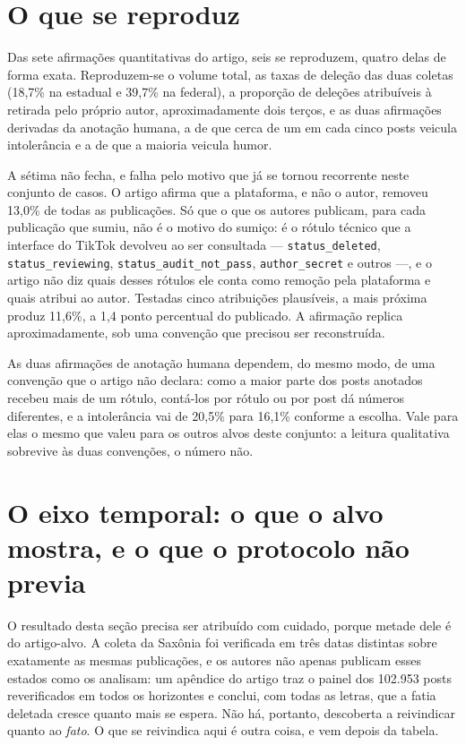\section{O que se reproduz}
\label{sec:tiktok-reproduz}

Das sete afirmações quantitativas do artigo, seis se reproduzem, quatro delas de
forma exata. Reproduzem-se o volume total, as taxas de deleção das duas coletas
(18,7\% na estadual e 39,7\% na federal), a proporção de deleções atribuíveis à
retirada pelo próprio autor, aproximadamente dois terços, e as duas afirmações
derivadas da anotação humana, a de que cerca de um em cada cinco posts veicula
intolerância e a de que a maioria veicula humor.

A sétima não fecha, e falha pelo motivo que já se tornou recorrente neste conjunto de
casos. O artigo afirma que a plataforma, e não o autor, removeu 13,0\% de todas as
publicações. Só que o que os autores publicam, para cada publicação que sumiu, não é o
motivo do sumiço: é o rótulo técnico que a interface do TikTok devolveu ao ser
consultada --- \texttt{status\_deleted}, \texttt{status\_reviewing},
\texttt{status\_audit\_not\_pass}, \texttt{author\_secret} e outros ---, e o artigo não
diz quais desses rótulos ele conta como remoção pela plataforma e quais atribui ao
autor. Testadas cinco atribuições plausíveis, a mais próxima produz 11,6\%, a 1,4 ponto
percentual do publicado. A afirmação replica aproximadamente, sob uma convenção que
precisou ser reconstruída.

As duas afirmações de anotação humana dependem, do mesmo modo, de uma convenção que o
artigo não declara: como a maior parte dos posts anotados recebeu mais de um rótulo,
contá-los por rótulo ou por post dá números diferentes, e a intolerância vai de 20,5\%
para 16,1\% conforme a escolha. Vale para elas o mesmo que valeu para os outros alvos
deste conjunto: a leitura qualitativa sobrevive às duas convenções, o número não.

\section{O eixo temporal: o que o alvo mostra, e o que o protocolo não previa}
\label{sec:tiktok-eixo}

O resultado desta seção precisa ser atribuído com cuidado, porque metade dele é do
artigo-alvo. A coleta da Saxônia foi verificada em três datas distintas sobre exatamente
as mesmas publicações, e os autores não apenas publicam esses estados como os analisam:
um apêndice do artigo traz o painel dos 102.953 posts reverificados em todos os
horizontes e conclui, com todas as letras, que a fatia deletada cresce quanto mais se
espera. Não há, portanto, descoberta a reivindicar quanto ao \emph{fato}. O que se
reivindica aqui é outra coisa, e vem depois da tabela.

